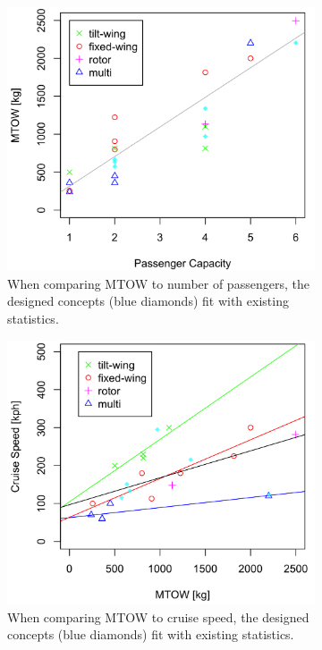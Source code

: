 \begin{figure}[H]
\begin{subfigure}[t]{0.5\textwidth}
    \centering
    \includegraphics[width=\textwidth]{Figures/MTOW-Pax2.png}
    \captionsetup{justification=centering}
    \caption{When comparing MTOW to number of passengers, the designed concepts (blue diamonds) fit with existing statistics.}
    \label{fig:MTOW-Pax2}
\end{subfigure}
\begin{subfigure}[t]{0.5\textwidth}
    \centering
    \includegraphics[width=\textwidth]{Figures/Cruise-MTOW2.png}
    \captionsetup{justification=centering}
    \caption{When comparing MTOW to cruise speed, the designed concepts (blue diamonds) fit with existing statistics.}
    \label{fig:Cruise-MTOW2}
\end{subfigure}
\captionsetup{justification=centering}
\caption{}
\label{fig:concept_compare}
\end{figure}
